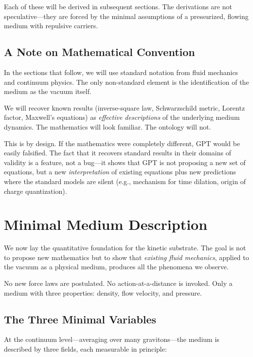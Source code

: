 \documentclass[12pt, a4paper]{article}
\begin{document}
Each of these will be derived in subsequent sections. The derivations are not speculative—they are forced by the minimal assumptions of a pressurized, flowing medium with repulsive carriers.

\subsection{A Note on Mathematical Convention}
\label{subsec:math_convention}

In the sections that follow, we will use standard notation from fluid mechanics and continuum physics. The only non-standard element is the identification of the medium as the vacuum itself.

We will recover known results (inverse-square law, Schwarzschild metric, Lorentz factor, Maxwell's equations) as \textit{effective descriptions} of the underlying medium dynamics. The mathematics will look familiar. The ontology will not.

This is by design. If the mathematics were completely different, GPT would be easily falsified. The fact that it recovers standard results in their domains of validity is a feature, not a bug—it shows that GPT is not proposing a new set of equations, but a new \textit{interpretation} of existing equations plus new predictions where the standard models are silent (e.g., mechanism for time dilation, origin of charge quantization).

\section{Minimal Medium Description}
\label{sec:minimal_medium}

We now lay the quantitative foundation for the kinetic substrate. The goal is not to propose new mathematics but to show that \textit{existing fluid mechanics}, applied to the vacuum as a physical medium, produces all the phenomena we observe.

No new force laws are postulated. No action-at-a-distance is invoked. Only a medium with three properties: density, flow velocity, and pressure.

\subsection{The Three Minimal Variables}
\label{subsec:three_variables}

At the continuum level—averaging over many gravitons—the medium is described by three fields, each measurable in principle:
\end{document}
